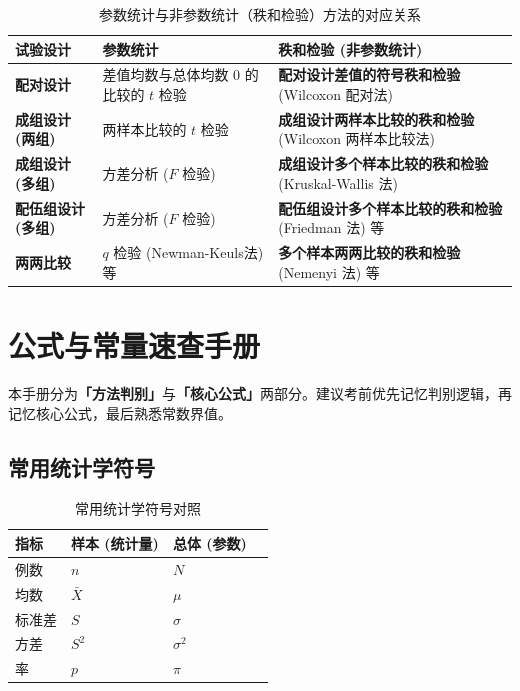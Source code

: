 \documentclass[lang=cn,10pt]{elegantbook}
\begin{document}
\begin{table}[htbp]
\centering
\caption{参数统计与非参数统计（秩和检验）方法的对应关系}
\begin{tabular}{p{3cm} p{5cm} p{6cm}}
\toprule
\textbf{试验设计} & \textbf{参数统计} & \textbf{秩和检验 (非参数统计)} \\
\midrule
\textbf{配对设计} & 差值均数与总体均数 0 的比较的 $t$ 检验 & \textbf{配对设计差值的符号秩和检验} (Wilcoxon 配对法) \\
\midrule
\textbf{成组设计 (两组)} & 两样本比较的 $t$ 检验 & \textbf{成组设计两样本比较的秩和检验} (Wilcoxon 两样本比较法) \\
\midrule
\textbf{成组设计 (多组)} & 方差分析 ($F$ 检验) & \textbf{成组设计多个样本比较的秩和检验} (Kruskal-Wallis 法) \\
\midrule
\textbf{配伍组设计 (多组)} & 方差分析 ($F$ 检验) & \textbf{配伍组设计多个样本比较的秩和检验} (Friedman 法) 等 \\
\midrule
\textbf{两两比较} & $q$ 检验 (Newman-Keuls法) 等 & \textbf{多个样本两两比较的秩和检验} (Nemenyi 法) 等 \\
\bottomrule
\end{tabular}
\end{table}

\chapter{公式与常量速查手册}

本手册分为\textbf{「方法判别」}与\textbf{「核心公式」}两部分。建议考前优先记忆判别逻辑，再记忆核心公式，最后熟悉常数界值。

\section{常用统计学符号}

\begin{table}[htbp]
  \centering
  \caption{常用统计学符号对照}
  \begin{tabularx}{\textwidth}{lXlX}
    \toprule
    \textbf{指标} & \textbf{样本 (统计量)} & \textbf{总体 (参数)} &  \\
    \midrule
    例数 & $n$ & $N$  \\
    均数 & $\bar{X}$ & $\mu$  \\
    标准差 & $S$ & $\sigma$  \\
    方差 & $S^2$ & $\sigma^2$  \\
    率 & $p$ & $\pi$  \\
    \bottomrule
  \end{tabularx}
\end{table}
\end{document}
